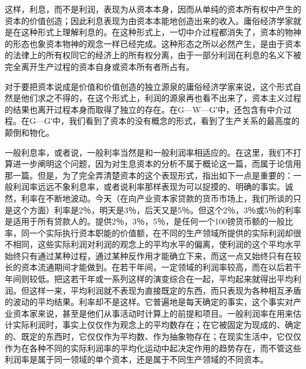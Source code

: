 这样，利息，而不是利润，表现为从资本本身，因而从单纯的资本所有权中产生的资本的价值创造；因此利息表现为由资本本能地创造出来的收入。庸俗经济学家就是在这种形式上理解利息的。在这种形式上，一切中介过程都消失了，资本的物神的形态也象资本物神的观念一样已经完成。这种形态之所以必然产生，是由于资本的法律上的所有权同它的经济上的所有权分离，由于一部分利润在利息的名义下被完全离开生产过程的资本自身或资本所有者所占有。

对于要把资本说成是价值和价值创造的独立源泉的庸俗经济学家来说，这个形式自然是他们求之不得的，在这个形式上，利润的源泉再也看不出来了，资本主义过程的结果也离开过程本身而取得了独立的存在。在G—W—G′中，还包含有中介过程。在G—G′中，我们看到了资本的没有概念的形式，看到了生产关系的最高度的颠倒和物化。

一般利息率，或者说，一般利率当然是和一般利润率相适应的。在这里，我们不打算进一步阐明这个问题，因为对生息资本的分析不属于概论这一篇，而属于论信用那一篇。但是，为了完全弄清楚资本的这个表现形式，指出如下一点是重要的：一般利润率远远不象利息率，或者说利率那样表现为可以捉摸的、明确的事实。诚然，利率在不断地波动。今天（在向产业资本家贷款的货币市场上，我们所谈的只是这个方面）利率是2％，明天是3％，后天又是5％。但这个2％，3％或5％的利率是适用于所有贷款人的。提供2％，3％，5％，是任何一个100镑货币额的一般比率，同一个实际执行资本职能的价值额，在不同的生产领域所提供的实际利润却很不相同，这些实际利润对利润的观念上的平均水平的偏离，使利润的这个平均水平始终只有通过某种过程，通过某种反作用才能确立下来，而这一点又始终只有在较长的资本流通期间才能做到。在若干年间，一定领域的利润率较高，而在以后若干年间则较低。把这若干年或一系列这样的演变综合在一起，平均起来就得出平均利润。但这样一来，平均利润就不表现为直接既定的东西，而只表现为各种相互矛盾的波动的平均结果。利率却不是这样。它普遍地是每天确定的事实，这个事实对产业资本家来说，甚至是他们从事活动时计算上的前提和项目。一般利润率在用来估计实际利润时，事实上仅仅作为观念上的平均数存在；在它被固定为现成的、确定的、既定的东西时，它仅仅作为平均数、作为抽象物存在；在现实生活中，它仅仅作为在各种不同的实际利润率的平均化运动中起决定作用的趋势存在，而不管这些利润率是属于同一领域的单个资本，还是属于不同生产领域的不同资本。

